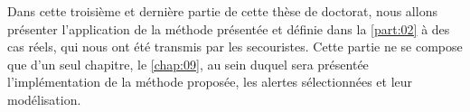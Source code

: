 Dans cette troisième et dernière partie de cette thèse de doctorat,
nous allons présenter l’application de la méthode présentée et définie
dans la \autoref{part:02} à des cas réels, qui nous ont été transmis
par les secouristes. Cette partie ne se compose que d'un seul
chapitre, le \ref{chap:09}, au sein duquel sera présentée
l'implémentation de la méthode proposée, les alertes sélectionnées et
leur modélisation.

